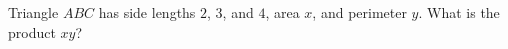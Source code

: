 Triangle $ABC$ has side lengths $2$, $3$, and $4$, area $x$, and perimeter $y$. What is the product $xy$?
